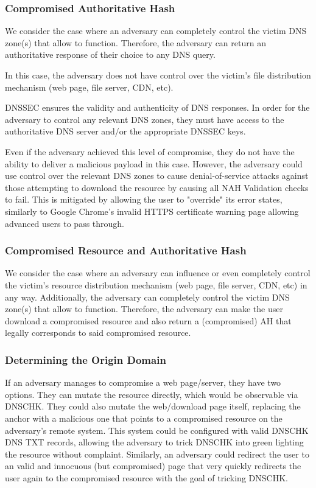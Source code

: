 \subsubsection{Compromised Authoritative Hash}

We consider the case where an adversary can completely control the victim DNS
zone(s) that allow \SYSTEM{} to function. Therefore, the adversary can return an
authoritative response of their choice to any DNS query.

In this case, the adversary does not have control over the victim's file
distribution mechanism (web page, file server, CDN, etc).

DNSSEC ensures the validity and authenticity of DNS responses. In order for the
adversary to control any relevant DNS zones, they must have access to the
authoritative DNS server and/or the appropriate DNSSEC keys.

Even if the adversary achieved this level of compromise, they do not have the
ability to deliver a malicious payload in this case. However, the adversary
could use control over the relevant DNS zones to cause denial-of-service attacks
against those attempting to download the resource by causing all NAH Validation
checks to fail. This is mitigated by \SYSTEM{} allowing the user to "override"
its error states, similarly to Google Chrome's invalid HTTPS certificate warning
page allowing advanced users to pass through.

\subsubsection{Compromised Resource and Authoritative Hash}

We consider the case where an adversary can influence or even completely control
the victim's resource distribution mechanism (web page, file server, CDN, etc)
in any way. Additionally, the adversary can completely control the victim DNS
zone(s) that allow \SYSTEM{} to function. Therefore, the adversary can make the
user download a compromised resource and also return a (compromised) AH that
legally corresponds to said compromised resource.

\subsubsection{Determining the Origin Domain}

If an adversary manages to compromise a web page/server, they have two options.
They can mutate the resource directly, which would be observable via DNSCHK.
They could also mutate the web/download page itself, replacing the anchor with a
malicious one that points to a compromised resource on the adversary's remote
system. This system could be configured with valid DNSCHK DNS TXT records,
allowing the adversary to trick DNSCHK into green lighting the resource without
complaint. Similarly, an adversary could redirect the user to an valid and
innocuous (but compromised) page that very quickly redirects the user again to
the compromised resource with the goal of tricking DNSCHK.

